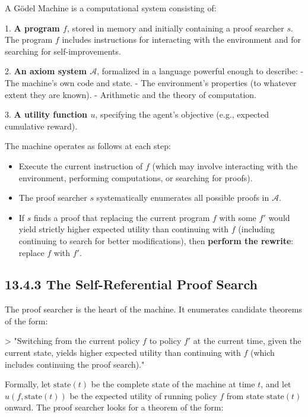 \begin{definition}
A Gödel Machine is a computational system consisting of:

1. \textbf{A program $f$}, stored in memory and initially containing a proof searcher $s$. The program $f$ includes instructions for interacting with the environment and for searching for self-improvements.

2. \textbf{An axiom system $\mathcal{A}$}, formalized in a language powerful enough to describe:
   - The machine's own code and state.
   - The environment's properties (to whatever extent they are known).
   - Arithmetic and the theory of computation.

3. \textbf{A utility function $u$}, specifying the agent's objective (e.g., expected cumulative reward).

The machine operates as follows at each step:

\begin{itemize}
\item Execute the current instruction of $f$ (which may involve interacting with the environment, performing computations, or searching for proofs).
\item The proof searcher $s$ systematically enumerates all possible proofs in $\mathcal{A}$.
\item If $s$ finds a proof that replacing the current program $f$ with some $f'$ would yield strictly higher expected utility than continuing with $f$ (including continuing to search for better modifications), then \textbf{perform the rewrite}: replace $f$ with $f'$.
\end{itemize}
\end{definition}

\subsection{13.4.3 The Self-Referential Proof Search}

The proof searcher is the heart of the machine. It enumerates candidate theorems of the form:

> "Switching from the current policy $f$ to policy $f'$ at the current time, given the current state, yields higher expected utility than continuing with $f$ (which includes continuing the proof search)."

Formally, let $\text{state}(t)$ be the complete state of the machine at time $t$, and let $u(f, \text{state}(t))$ be the expected utility of running policy $f$ from state $\text{state}(t)$ onward. The proof searcher looks for a theorem of the form:


